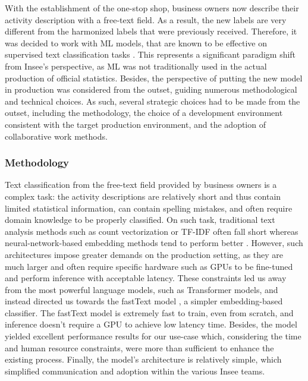 With the establishment of the one-stop shop, business owners now describe their activity description with a free-text field. As a result, the new labels are very different from the harmonized labels that were previously received. Therefore, it was decided to work with ML models, that are known to be effective on supervised text classification tasks \cite{li2022survey}. This represents a significant paradigm shift from Insee's perspective, as ML was not traditionally used in the actual production of official statistics. Besides, the perspective of putting the new model in production was considered from the outset, guiding numerous methodological and technical choices. As such, several strategic choices had to be made from the outset, including the methodology, the choice of a development environment consistent with the target production environment, and the adoption of collaborative work methods.

\subsubsection{Methodology}

Text classification from the free-text field provided by business owners is a complex task: the activity descriptions are relatively short and thus contain limited statistical information, can contain spelling mistakes, and often require domain knowledge to be properly classified. On such task, traditional text analysis methods such as count vectorization or TF-IDF often fall short whereas neural-network-based embedding methods tend to perform better \cite{li2022survey}. However, such architectures impose greater demands on the production setting, as they are much larger and often require specific hardware such as GPUs to be fine-tuned and perform inference with acceptable latency. These constraints led us away from the most powerful language models, such as Transformer models, and instead directed us towards the fastText model \cite{joulin2016bag}, a simpler embedding-based classifier. The fastText model is extremely fast to train, even from scratch, and inference doesn't require a GPU to achieve low latency time. Besides, the model yielded excellent performance results for our use-case which, considering the time and human resource constraints, were more than sufficient to enhance the existing process. Finally, the model's architecture is relatively simple, which simplified communication and adoption within the various Insee teams.


